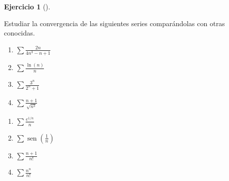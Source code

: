 \documentclass[
  a4paper,
]{scrreport}
\theoremstyle{definition}
\newtheorem{exercise}{Ejercicio}[chapter]
\theoremstyle{remark}
\begin{document}
\begin{exercise}[]\protect\hypertarget{exr-comparacion-series}{}\label{exr-comparacion-series}

Estudiar la convergencia de las siguientes series comparándolas con
otras conocidas.

\begin{enumerate}
\def\labelenumi{\alph{enumi}.}
\item
  \(\sum \frac{2n}{4n^3-n+1}\)
\item
  \(\sum \frac{\ln(n)}{n}\)
\item
  \(\sum \frac{3^n}{2^n+1}\)
\item
  \(\sum \frac{n+1}{\sqrt{n^3}}\)
\end{enumerate}

\begin{enumerate}
\def\labelenumi{\alph{enumi}.}
\setcounter{enumi}{4}
\item
  \(\sum \frac{e^{1/n}}{n}\)
\item
  \(\sum \operatorname{sen}\left(\frac{1}{n}\right)\)
\item
  \(\sum \frac{n+1}{n!}\)
\item
  \(\sum \frac{n^n}{n!}\)
\end{enumerate}

\end{exercise}
\end{document}
